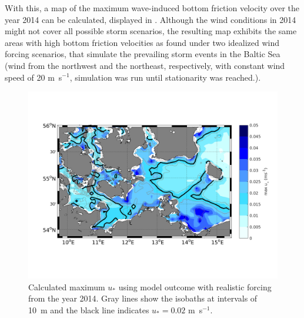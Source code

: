 With this, a map of the maximum wave-induced bottom friction velocity over the 
year 2014 can be calculated, displayed in . Although the wind 
conditions in 2014 might not cover all possible storm scenarios, the 
resulting map exhibits the same areas with high bottom friction velocities as 
found under two idealized wind forcing scenarios, that simulate the prevailing 
storm events in the Baltic Sea (wind from the northwest and the northeast, 
respectively, with constant wind speed of 20 m~s$^{-1}$, simulation was run 
until stationarity was reached.).

\begin{figure}[ht]
 \includegraphics[width=16cm]{bilder/ubot_real.png}
 \caption{Calculated maximum $u_\ast$ using model outcome with realistic 
forcing from the year 2014. Gray lines show the 
isobaths at intervals of 10~m and the black line indicates $u_\ast = 0.02$ 
m~s$^{-1}$.\label{ustar_real}}
\end{figure}

